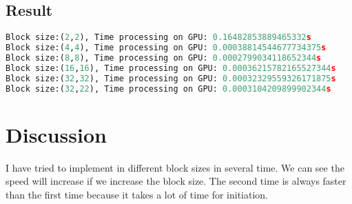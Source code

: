 \documentclass[12pt]{article}
\begin{document}
\subsection{Result}
\begin{lstlisting}[language=Python]
Block size:(2,2), Time processing on GPU: 0.16482853889465332s
Block size:(4,4), Time processing on GPU: 0.00038814544677734375s
Block size:(8,8), Time processing on GPU: 0.0002799034118652344s
Block size:(16,16), Time processing on GPU: 0.00036215782165527344s
Block size:(32,32), Time processing on GPU: 0.00032329559326171875s
Block size:(32,22), Time processing on GPU: 0.0003104209899902344s
\end{lstlisting}

\section{Discussion}
I have tried to implement in different block sizes in several time. 
We can see the speed will increase if we increase the block size.
The second time is always faster than the first time because it takes a lot of time for initiation.
\end{document}
